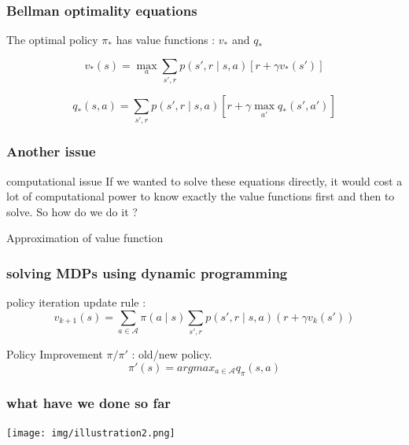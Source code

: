 \documentclass[dvipsnames,svgnames]{beamer}
\begin{document}
\begin{frame}
\frametitle{Bellman optimality equations}

The optimal policy $\pi_{*}$ has value functions : $v_*$ and $q_*$

\begin{block}{}

\begin{equation}
v_{*}(s)=\max_{a} \sum_{s',r}p(s',r\mid s,a)[r+\gamma v_{*}(s')]
\label{bellman_opt_v}
\end{equation}

\begin{equation}
q_{*}(s,a)= \sum_{s',r}p(s',r \mid s,a)[r+\gamma \max_{a'}q_{*}(s',a')]
\label{bellman_opt_q}
\end{equation}
\end{block}

\end{frame}

\begin{frame}
\frametitle{Another issue}
\begin{alertblock}{computational issue}
If we wanted to solve these equations directly, it would cost a lot of computational power to know exactly the value functions first and then to solve. So how do we do it ? 
\end{alertblock}

\pause 
\vspace{1cm}
\centering
Approximation of value function

\end{frame}

\begin{frame}
\frametitle{solving MDPs using dynamic programming}
\begin{block}{policy iteration}
update rule : 
$$ v_{k+1}(s)=\sum_{a \in \mathcal{A}}\pi(a \mid s)\sum_{s',r}p(s',r\mid s,a)(r+\gamma v_k(s')) $$
\end{block}
\pause
\begin{block}{Policy Improvement}
$\pi/\pi'$ : old/new policy.
$$\pi'(s) = argmax_{a \in \mathcal{A}}q_{\pi}(s,a) $$
\end{block}

\end{frame}


\begin{frame}
\frametitle{what have we done so far}
\begin{center}
\texttt{[image: img/illustration2.png]}
\end{center}
\end{frame}
\end{document}
